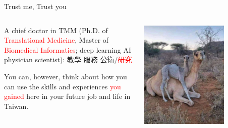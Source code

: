 \documentclass[aspectratio=169]{beamer}
\begin{document}
\begin{frame}{Trust me, Trust you}

\begin{columns}
    
\begin{outline}

\1 A chief doctor in TMM (Ph.D. of \textcolor{red}{Translational Medicine}, Master of \textcolor{red}{ Biomedical Informatics}; deep learning AI physician scientist):
    \2 教學
    \2 服務
    \2 公衛/\textcolor{red}{研究}

\1 You can, however, think about how you can use the skills and experiences \textcolor{red}{you gained} here in your future job and life in Taiwan.

\end{outline}

\includegraphics[width=0.7\textwidth]{IMG-5113.JPG}
\end{columns}

\end{frame}
\end{document}
